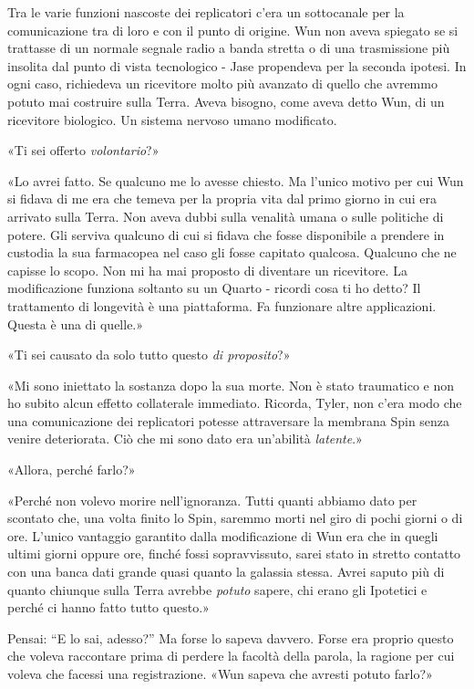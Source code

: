 Tra le varie funzioni nascoste dei replicatori c'era un sottocanale per
la comunicazione tra di loro e con il punto di origine. Wun non aveva
spiegato se si trattasse di un normale segnale radio a banda stretta o
di una trasmissione più insolita dal punto di vista tecnologico - Jase
propendeva per la seconda ipotesi. In ogni caso, richiedeva un
ricevitore molto più avanzato di quello che avremmo potuto mai costruire
sulla Terra. Aveva bisogno, come aveva detto Wun, di un ricevitore
biologico. Un sistema nervoso umano modificato.

\separatorefiori

«Ti sei offerto \emph{volontario}?»

«Lo avrei fatto. Se qualcuno me lo avesse chiesto. Ma l'unico motivo per
cui Wun si fidava di me era che temeva per la propria vita dal primo
giorno in cui era arrivato sulla Terra. Non aveva dubbi sulla venalità
umana o sulle politiche di potere. Gli serviva qualcuno di cui si fidava
che fosse disponibile a prendere in custodia la sua farmacopea nel caso
gli fosse capitato qualcosa. Qualcuno che ne capisse lo scopo. Non mi ha
mai proposto di diventare un ricevitore. La modificazione funziona
soltanto su un Quarto - ricordi cosa ti ho detto? Il trattamento di
longevità è una piattaforma. Fa funzionare altre applicazioni. Questa è
una di quelle.»

«Ti sei causato da solo tutto questo \emph{di proposito}?»

«Mi sono iniettato la sostanza dopo la sua morte. Non è stato traumatico
e non ho subito alcun effetto collaterale immediato. Ricorda, Tyler, non
c'era modo che una comunicazione dei replicatori potesse attraversare la
membrana Spin senza venire deteriorata. Ciò che mi sono dato era
un'abilità \emph{latente}.»

«Allora, perché farlo?»

«Perché non volevo morire nell'ignoranza. Tutti quanti abbiamo dato per
scontato che, una volta finito lo Spin, saremmo morti nel giro di pochi
giorni o di ore. L'unico vantaggio garantito dalla modificazione di Wun
era che in quegli ultimi giorni oppure ore, finché fossi sopravvissuto,
sarei stato in stretto contatto con una banca dati grande quasi quanto
la galassia stessa. Avrei saputo più di quanto chiunque sulla Terra
avrebbe \emph{potuto} sapere, chi erano gli Ipotetici e perché ci hanno
fatto tutto questo.»

Pensai: ``E lo sai, adesso?'' Ma forse lo sapeva davvero. Forse era
proprio questo che voleva raccontare prima di perdere la facoltà della
parola, la ragione per cui voleva che facessi una registrazione. «Wun
sapeva che avresti potuto farlo?»


